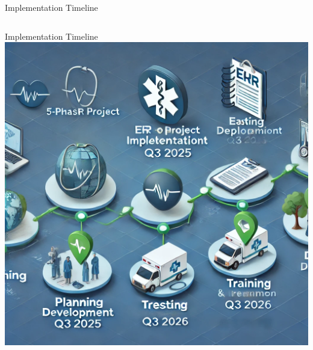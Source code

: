 \documentclass[aspectratio=169]{beamer}
\begin{document}
\begin{frame}{Implementation Timeline}
\begin{columns}[T]
    \end{columns}
\end{frame}

\begin{frame}{Implementation Timeline}
    \includegraphics[height=0.9\textheight]{roadmap_illustration.png}
\end{frame}

\end{document}
